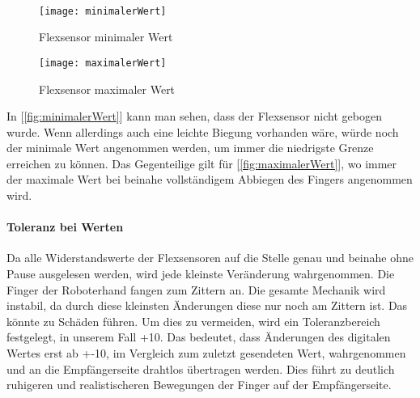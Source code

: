 \documentclass[titlepage,12pt,twoside]{article}
\begin{document}
\\
\begin{figure}[H]
	\begin{center}
		\scalebox{0.5}
		{\texttt{[image: minimalerWert]}}
		\caption{Flexsensor minimaler Wert}
		\label{fig:minimalerWert}			
	\end{center}
\end{figure}
\begin{figure}[H]
	\begin{center}
		\scalebox{0.5}
		{\texttt{[image: maximalerWert]}}
		\caption{Flexsensor maximaler Wert}
		\label{fig:maximalerWert}			
	\end{center}
\end{figure}
\hfill \break
In [\textcolor{blue}{\autoref{fig:minimalerWert}}] kann man sehen, dass der Flexsensor nicht gebogen wurde. Wenn allerdings auch eine leichte Biegung vorhanden wäre, würde noch der 
minimale Wert angenommen werden, um immer die niedrigste Grenze erreichen zu können. Das Gegenteilige gilt für [\textcolor{blue}{\autoref{fig:maximalerWert}}], wo immer der maximale 
Wert bei beinahe vollständigem Abbiegen des Fingers angenommen wird. \\
\paragraph{Toleranz bei Werten}
\hfill \break
\hfill \break
Da alle Widerstandswerte der Flexsensoren auf die Stelle genau und beinahe ohne 
Pause ausgelesen werden, wird jede kleinste Veränderung wahrgenommen. Die 
Finger der Roboterhand fangen zum Zittern an. Die gesamte Mechanik wird instabil, 
da durch diese kleinsten Änderungen diese nur noch am Zittern ist. Das könnte 
zu Schäden führen. Um dies zu vermeiden, wird ein Toleranzbereich festgelegt, 
in unserem Fall +10. Das bedeutet, dass Änderungen des digitalen Wertes erst 
ab +-10, im Vergleich zum zuletzt gesendeten Wert, wahrgenommen und an die 
Empfängerseite drahtlos übertragen werden. Dies führt zu deutlich ruhigeren 
und realistischeren Bewegungen der Finger auf der Empfängerseite. \\
\\
\end{document}
